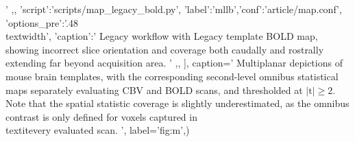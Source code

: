 {{                                '
			,},
		{'script':'scripts/map_legacy_bold.py', 'label':'mllb','conf':'article/map.conf', 'options_pre':'{.48\\textwidth}',
			'caption':'
				Legacy workflow with Legacy template BOLD map, showing incorrect slice orientation and coverage both caudally and rostrally extending far beyond acquisition area.
			        '
                        ,},
		],
	caption='
                Multiplanar depictions of mouse brain templates, with the corresponding second-level omnibus statistical maps separately evaluating CBV and BOLD scans, and thresholded at $\mathrm{|t|\geq2}$.
                Note that the spatial statistic coverage is slightly underestimated, as the omnibus contrast is only defined for voxels captured in \\textit{every} evaluated scan.
                ',
	label='fig:m',)}
